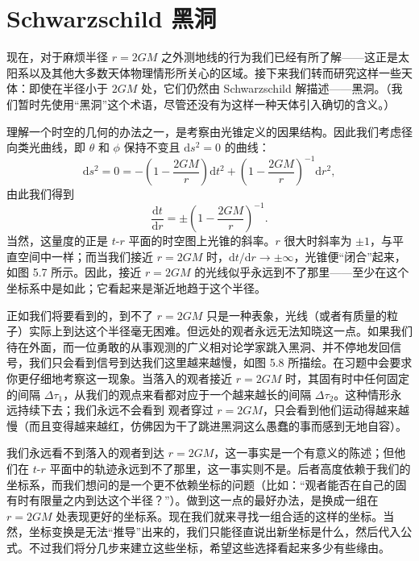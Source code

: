 \section{Schwarzschild 黑洞}

现在，对于麻烦半径 $r = 2GM$ 之外测地线的行为我们已经有所了解——这正是太阳系以及其他大多数天体物理情形所关心的区域。接下来我们转而研究这样一些天体：即使在半径小于 $2GM$ 处，它们仍然由 Schwarzschild 解描述——黑洞。（我们暂时先使用“黑洞”这个术语，尽管还没有为这样一种天体引入确切的含义。）

理解一个时空的几何的办法之一，是考察由光锥定义的因果结构。因此我们考虑径向类光曲线，即 $\theta$ 和 $\phi$ 保持不变且 $\mathrm{d}s^2 = 0$ 的曲线：
\begin{equation*}
\mathrm{d}s^2 = 0 = -\left(1 - \frac{2GM}{r}\right)\mathrm{d}t^2 + \left(1 - \frac{2GM}{r}\right)^{-1}\mathrm{d}r^2,
\tag{5.105}
\end{equation*}
由此我们得到
\begin{equation*}
\frac{\mathrm{d}t}{\mathrm{d}r} = \pm\left(1 - \frac{2GM}{r}\right)^{-1}.
\tag{5.106}
\end{equation*}
当然，这量度的正是 $t$-$r$ 平面的时空图上光锥的斜率。$r$ 很大时斜率为 $\pm 1$，与平直空间中一样；而当我们接近 $r = 2GM$ 时，$\mathrm{d}t/\mathrm{d}r \to \pm\infty$，光锥便“闭合”起来，如图 5.7 所示。因此，接近 $r = 2GM$ 的光线似乎永远到不了那里——至少在这个坐标系中是如此；它看起来是渐近地趋于这个半径。

正如我们将要看到的，到不了 $r = 2GM$ 只是一种表象，光线（或者有质量的粒子）实际上到达这个半径毫无困难。但远处的观者永远无法知晓这一点。如果我们待在外面，而一位勇敢的从事观测的广义相对论学家跳入黑洞、并不停地发回信号，我们只会看到信号到达我们这里越来越慢，如图 5.8 所描绘。在习题中会要求你更仔细地考察这一现象。当落入的观者接近 $r = 2GM$ 时，其固有时中任何固定的间隔 $\Delta\tau_1$，从我们的观点来看都对应于一个越来越长的间隔 $\Delta\tau_2$。这种情形永远持续下去；我们永远不会看到
观者穿过 $r = 2GM$，只会看到他们运动得越来越慢（而且变得越来越红，仿佛因为干了跳进黑洞这么愚蠢的事而感到无地自容）。

我们永远看不到落入的观者到达 $r = 2GM$，这一事实是一个有意义的陈述；但他们在 $t$-$r$ 平面中的轨迹永远到不了那里，这一事实则不是。后者高度依赖于我们的坐标系，而我们想问的是一个更不依赖坐标的问题（比如：“观者能否在自己的固有时有限量之内到达这个半径？”）。做到这一点的最好办法，是换成一组在 $r = 2GM$ 处表现更好的坐标系。现在我们就来寻找一组合适的这样的坐标。当然，坐标变换是无法“推导”出来的，我们只能径直说出新坐标是什么，然后代入公式。不过我们将分几步来建立这些坐标，希望这些选择看起来多少有些缘由。

